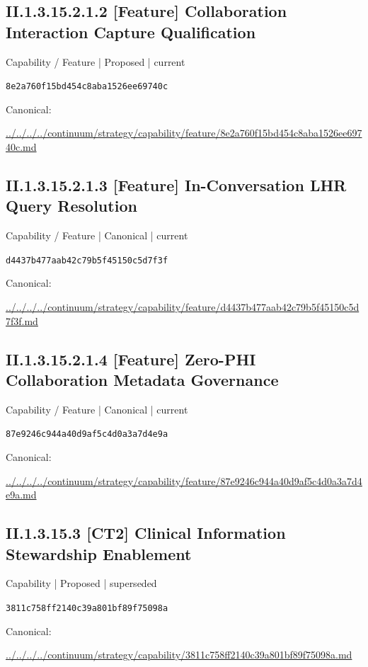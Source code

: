 \documentclass[10pt,a4paper]{article}
\begin{document}
\subsection*{II.1.3.15.2.1.2 [Feature] Collaboration Interaction Capture Qualification}
{\small Capability / Feature | Proposed | current}\par
\texttt{8e2a760f15bd454c8aba1526ee69740c}\par
Canonical: \par
{\footnotesize\url{../../../../continuum/strategy/capability/feature/8e2a760f15bd454c8aba1526ee69740c.md}}\par
\subsection*{II.1.3.15.2.1.3 [Feature] In-Conversation LHR Query Resolution}
{\small Capability / Feature | Canonical | current}\par
\texttt{d4437b477aab42c79b5f45150c5d7f3f}\par
Canonical: \par
{\footnotesize\url{../../../../continuum/strategy/capability/feature/d4437b477aab42c79b5f45150c5d7f3f.md}}\par
\subsection*{II.1.3.15.2.1.4 [Feature] Zero-PHI Collaboration Metadata Governance}
{\small Capability / Feature | Canonical | current}\par
\texttt{87e9246c944a40d9af5c4d0a3a7d4e9a}\par
Canonical: \par
{\footnotesize\url{../../../../continuum/strategy/capability/feature/87e9246c944a40d9af5c4d0a3a7d4e9a.md}}\par
\subsection*{II.1.3.15.3 [CT2] Clinical Information Stewardship Enablement}
{\small Capability | Proposed | superseded}\par
\texttt{3811c758ff2140c39a801bf89f75098a}\par
Canonical: \par
{\footnotesize\url{../../../../continuum/strategy/capability/3811c758ff2140c39a801bf89f75098a.md}}\par
\end{document}
